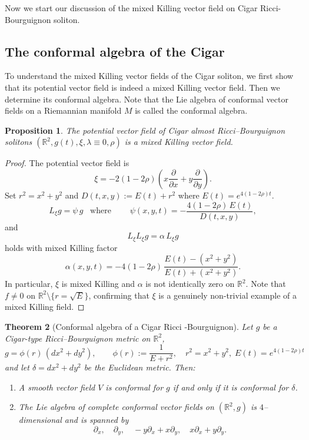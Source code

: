 \documentclass{article}
\newtheorem{theorem}{Theorem}[section]
\newtheorem{proposition}[theorem]{Proposition}
\theoremstyle{definition}
\theoremstyle{remark}
\begin{document}
Now we start our discussion of the mixed Killing vector field 
on Cigar Ricci-Bourguignon soliton.


\subsection{The conformal algebra of the Cigar}
To understand the mixed Killing vector fields of the Cigar soliton, we first show that its potential vector field is indeed
a mixed Killing vector field. Then we determine its conformal algebra. Note that the Lie algebra of conformal vector fields on a Riemannian manifold \(M\) is called the conformal algebra. 

\begin{proposition}\label{pro:mixed-killing-Cigar}
The potential vector field of  Cigar almost 
Ricci--Bourguignon  solitons  $(\mathbb{R}^2,g(t),\xi,\lambda\equiv 0,\rho)$ is a mixed Killing vector field.
\end{proposition}
\begin{proof}
The potential vector field is
\[
\xi
 = -2(1-2\rho)\left(x\frac{\partial}{\partial x}
                    +y\frac{\partial}{\partial y}\right).
\]
Set $r^2=x^2+y^2$ and $D(t,x,y):=E(t)+r^2$ where  $E(t)=e^{4(1-2\rho)t}.$
\[
L_\xi g = \psi\,g  \;\;\; \mbox{where} \;
\qquad 
\psi(x,y,t) = -\frac{4(1-2\rho)\,E(t)}{D(t,x,y)},
\]
and
\[
L_\xi L_\xi g =  \alpha \,L_\xi g
\]
holds with mixed Killing factor
\begin{equation}\label{eq:mixed-killing-factor-Cigar}
  \alpha(x,y,t)
  = -4(1-2\rho)\,\frac{E(t) - (x^2+y^2)}{E(t) + (x^2+y^2)}.
\end{equation}
In particular, $\xi$ is mixed Killing and $\alpha$ is not identically zero on
$\mathbb{R}^2$.
Note that $f \neq 0$ on $\mathbb{R}^2 \setminus \{r = \sqrt{E}\}$, 
confirming that $\xi$ is a genuinely non-trivial example of a mixed 
Killing field.
\end{proof}


\begin{theorem}[Conformal algebra of a Cigar Ricci -Bourguignon]\label{theorem:conf-4d}
Let $g$ be a Cigar-type Ricci--Bourguignon metric on $\mathbb{R}^2$,
\[
g = \phi(r)\,(dx^2 + dy^2),\qquad
\phi(r) := \frac{1}{E + r^2},\quad r^2 = x^2 + y^2, \;  E(t)=e^{4(1-2\rho)t}
\]
and let $\delta = dx^2 + dy^2$ be the Euclidean metric. Then:
\begin{enumerate}
\item[\textup{(i)}] A smooth vector field $V$ is conformal for $g$ if and only if it is conformal for $\delta$.

\item[\textup{(ii)}] The Lie algebra of complete conformal vector fields on $(\mathbb{R}^2,g)$ is $4$--dimensional and is spanned by
\[
\partial_x,\quad \partial_y,\quad -y\partial_x + x\partial_y,\quad x\partial_x + y\partial_y.
\]
\end{enumerate}
\end{theorem}
\end{document}
